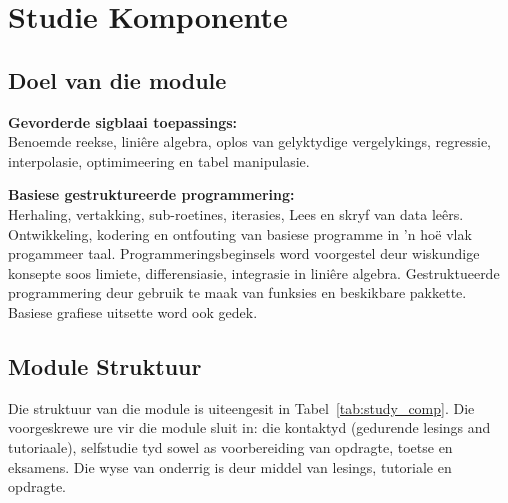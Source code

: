 \section{Studie Komponente}
    \subsection{Doel van die module}
        {\bf Gevorderde sigblaai toepassings:} \\ Benoemde reekse, lini\^{e}re
        algebra, oplos van gelyktydige vergelykings, regressie, interpolasie,
        optimimeering en tabel manipulasie.

        {\bf Basiese gestruktureerde programmering:} \\ Herhaling, vertakking,
        sub-roetines, iterasies, Lees en skryf van data le\^{e}rs.
        Ontwikkeling, kodering en ontfouting van basiese programme in 'n
        ho\"{e} vlak progammeer taal. Programmeringsbeginsels word voorgestel
        deur wiskundige konsepte soos limiete, differensiasie, integrasie in
        lini\^{e}re algebra.  Gestruktueerde programmering deur gebruik te maak
        van funksies en beskikbare pakkette.  Basiese grafiese uitsette word
        ook gedek.

    \subsection{Module Struktuur}
        Die struktuur van die module is uiteengesit in
        Tabel~\ref{tab:study_comp}.  Die voorgeskrewe ure vir die module sluit
        in: die kontaktyd (gedurende lesings and tutoriaale), selfstudie tyd
        sowel as voorbereiding van opdragte, toetse en eksamens. Die wyse van
        onderrig is deur middel van lesings, tutoriale en opdragte.

